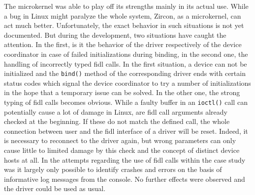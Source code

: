 The microkernel was able to play off its strengths mainly in its actual use.
While a bug in Linux might paralyze the whole system, Zircon, as a microkernel, can act much better.
Unfortunately, the exact behavior in such situations is not yet documented.
But during the development, two situations have caught the attention.
In the first, is it the behavior of the driver respectively of the device coordinator in case of failed initializations during binding, in the second one, the handling of incorrectly typed \ac{fidl} calls.
In the first situation, a device can not be initialized and the \texttt{bind()} method of the corresponding driver ends with certain status codes which signal the device coordinator to try a number of initializations in the hope that a temporary issue can be solved.
In the other one, the strong typing of \ac{fidl} calls becomes obvious.
While a faulty buffer in an \texttt{ioctl()} call can potentially cause a lot of damage in Linux, are \ac{fidl} call arguments already checked at the beginning.
If these do not match the defined call, the whole connection between user and the \ac{fidl} interface of a driver will be reset.
Indeed, it is necessary to reconnect to the driver again, but wrong parameters can only cause little to limited damage by this check and the concept of distinct device hosts at all.
In the attempts regarding the use of \ac{fidl} calls within the case study was it largely only possible to identify crashes and errors on the basis of informative log messages from the console.
No further effects were observed and the driver could be used as usual.

